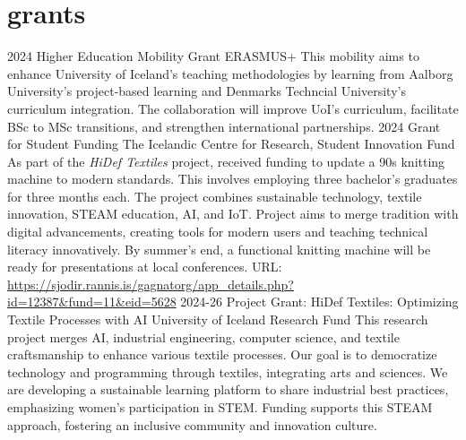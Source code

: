 \section{grants}
\begin{entrylist}
\entry
{2024}
{Higher Education Mobility Grant}
{ERASMUS+}
{This mobility aims to enhance University of Iceland's teaching methodologies by learning
from Aalborg University's project-based learning and Denmarks Techncial University's curriculum
integration. The collaboration will improve UoI's curriculum, facilitate BSc to MSc transitions,
and strengthen international partnerships.}
\entry
{2024}
{Grant for Student Funding}
{The Icelandic Centre for Research, Student Innovation Fund}
{
As part of the \emph{HiDef Textiles} project, received funding to update a 90s knitting machine to
modern standards. This involves employing three bachelor's graduates for three months each. The
project combines sustainable technology, textile innovation, STEAM education, AI, and IoT.
Project aims to merge tradition with digital advancements, creating tools for modern users and
teaching technical literacy innovatively. By summer's end, a functional knitting machine will be
ready for presentations at local conferences.
URL: \url{https://sjodir.rannis.is/gagnatorg/app_details.php?id=12387&fund=11&eid=5628}
}
\entry
{2024-26}
{Project Grant: HiDef Textiles: Optimizing Textile Processes with AI}
{University of Iceland Research Fund}
{This research project merges AI, industrial engineering, computer science, and textile
craftsmanship to enhance various textile processes. Our goal is to democratize technology and
programming through textiles, integrating arts and sciences. We are developing a sustainable
learning platform to share industrial best practices, emphasizing women's participation in STEM.
Funding supports this STEAM approach, fostering an inclusive community and innovation culture.
}
\end{entrylist}

